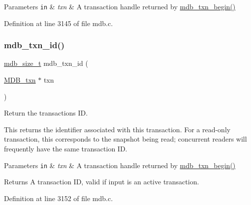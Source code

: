 \begin{DoxyParams}[1]{Parameters}
\mbox{\tt in}  & {\em txn} & A transaction handle returned by \mbox{\hyperlink{group__mdb_gad7ea55da06b77513609efebd44b26920}{mdb\+\_\+txn\+\_\+begin()}} \\
\hline
\end{DoxyParams}


Definition at line 3145 of file mdb.\+c.

\mbox{\label{group__mdb_ga7b057cd5215b52b5bfa85d30699d3c8d}} 
\subsubsection{\texorpdfstring{mdb\+\_\+txn\+\_\+id()}{mdb\_txn\_id()}}
{\footnotesize\ttfamily \mbox{\hyperlink{lmdb_8h_a78821971e612e3898ef4b3ae45ed86f1}{mdb\+\_\+size\+\_\+t}} mdb\+\_\+txn\+\_\+id (\begin{DoxyParamCaption}\item[{\mbox{\hyperlink{struct_m_d_b__txn}{M\+D\+B\+\_\+txn}} $\ast$}]{txn }\end{DoxyParamCaption})}



Return the transaction\textquotesingle{}s ID. 

This returns the identifier associated with this transaction. For a read-\/only transaction, this corresponds to the snapshot being read; concurrent readers will frequently have the same transaction ID.


\begin{DoxyParams}[1]{Parameters}
\mbox{\tt in}  & {\em txn} & A transaction handle returned by \mbox{\hyperlink{group__mdb_gad7ea55da06b77513609efebd44b26920}{mdb\+\_\+txn\+\_\+begin()}} \\
\hline
\end{DoxyParams}
\begin{DoxyReturn}{Returns}
A transaction ID, valid if input is an active transaction. 
\end{DoxyReturn}


Definition at line 3152 of file mdb.\+c.

\mbox{\label{group__mdb_ga6c6f917959517ede1c504cf7c720ce6d}} 
